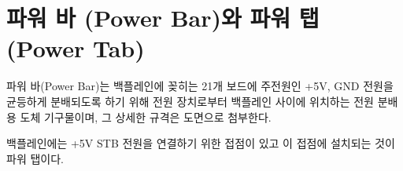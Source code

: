 \section{파워 바 (Power Bar)와 파워 탭 (Power Tab)}
파워 바(Power Bar)는 백플레인에 꽂히는 21개 보드에 주전원인
+5V, GND 전원을
균등하게 분배되도록 하기 위해 전원 장치로부터 백플레인 사이에 위치하는 
전원 분배용 도체 기구물이며, 그 상세한 규격은 도면으로 첨부한다.

백플레인에는 +5V STB 전원을
연결하기 위한 접점이 있고 이 접점에 설치되는 것이 파워 탭이다.
%
